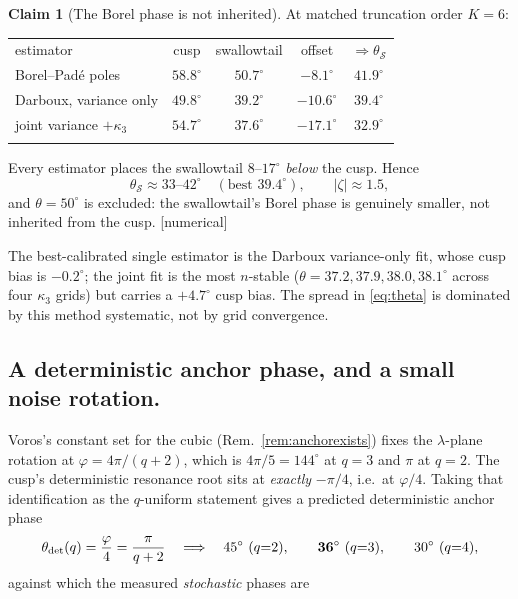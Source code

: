 \documentclass[11pt,reqno]{amsart}
\theoremstyle{plain}
\theoremstyle{definition}
\newtheorem{claim}[theorem]{Claim}
\theoremstyle{remark}
\newcommand{\Sw}{\mathcal{S}}
\newcommand{\tagN}{{\footnotesize\textsf{[numerical]}}}
\begin{document}
\begin{claim}[The Borel phase is not inherited]\label{claim:theta}
At matched truncation order $K=6$:
\begin{center}
\begin{tabular}{lcccc}
\hline\noalign{\smallskip}
estimator & cusp & swallowtail & offset & $\Rightarrow\theta_{\Sw}$\\
\noalign{\smallskip}\hline\noalign{\smallskip}
Borel--Pad\'e poles       & $58.8^\circ$ & $50.7^\circ$ & $-8.1^\circ$  & $41.9^\circ$\\
Darboux, variance only    & $49.8^\circ$ & $39.2^\circ$ & $-10.6^\circ$ & $39.4^\circ$\\
joint variance $+\kappa_3$& $54.7^\circ$ & $37.6^\circ$ & $-17.1^\circ$ & $32.9^\circ$\\
\noalign{\smallskip}\hline
\end{tabular}
\end{center}
Every estimator places the swallowtail $8$--$17^\circ$ \emph{below} the cusp. Hence
\begin{equation}\label{eq:theta}
\theta_{\Sw}\approx33\text{--}42^\circ\quad(\text{best }39.4^\circ),\qquad|\zeta|\approx1.5,
\end{equation}
and $\theta=50^\circ$ is excluded: the swallowtail's Borel phase is genuinely smaller, not inherited
from the cusp. \tagN
\end{claim}

The best-calibrated single estimator is the Darboux variance-only fit, whose cusp bias is
$-0.2^\circ$; the joint fit is the most $n$-stable ($\theta=37.2,37.9,38.0,38.1^\circ$ across four
$\kappa_3$ grids) but carries a $+4.7^\circ$ cusp bias. The spread in \eqref{eq:theta} is dominated
by this method systematic, not by grid convergence.

\subsection{A deterministic anchor phase, and a small noise rotation.}
Voros's constant set for the cubic (Rem.~\ref{rem:anchorexists}) fixes the $\lambda$-plane rotation
at $\varphi=4\pi/(q+2)$, which is $4\pi/5=144^\circ$ at $q=3$ and $\pi$ at $q=2$. The cusp's
deterministic resonance root sits at \emph{exactly} $-\pi/4$, i.e.\ at $\varphi/4$. Taking that
identification as the $q$-uniform statement gives a predicted deterministic anchor phase
\begin{equation}\label{eq:anchorphase}
\theta_{\rm det}(q)=\frac{\varphi}{4}=\frac{\pi}{q+2}
\quad\Longrightarrow\quad 45^\circ\ (q{=}2),\qquad \mathbf{36^\circ}\ (q{=}3),\qquad 30^\circ\ (q{=}4),
\end{equation}
against which the measured \emph{stochastic} phases are
\end{document}
